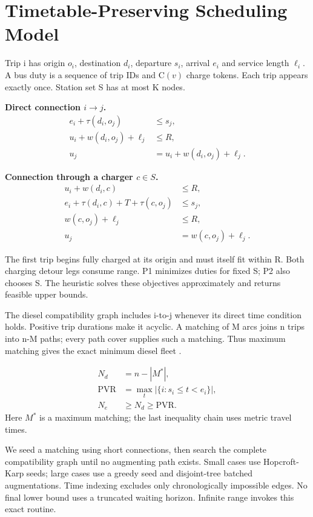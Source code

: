 
\section{Timetable-Preserving Scheduling Model}

Trip i has origin $o_i$, destination $d_i$, departure $s_i$, arrival $e_i$ and service length $\ell_i$. A bus duty is a sequence of trip IDs and $\mathrm{C}(v)$ charge tokens. Each trip appears exactly once. Station set S has at most K nodes.


\noindent\textbf{Direct connection $i\to j$.}
\begin{align}
e_i+\tau(d_i,o_j)&\le s_j,\\
u_i+w(d_i,o_j)+\ell_j&\le R,\\
u_j&=u_i+w(d_i,o_j)+\ell_j.
\end{align}

\noindent\textbf{Connection through a charger $c\in S$.}
\begin{align}
u_i+w(d_i,c)&\le R,\\
e_i+\tau(d_i,c)+T+\tau(c,o_j)&\le s_j,\\
w(c,o_j)+\ell_j&\le R,\\
u_j&=w(c,o_j)+\ell_j.
\end{align}

The first trip begins fully charged at its origin and must itself fit within R. Both charging detour legs consume range. P1 minimizes duties for fixed S; P2 also chooses S. The heuristic solves these objectives approximately and returns feasible upper bounds.


The diesel compatibility graph includes i-to-j whenever its direct time condition holds. Positive trip durations make it acyclic. A matching of M arcs joins n trips into n-M paths; every path cover supplies such a matching. Thus maximum matching gives the exact minimum diesel fleet \cite{ref17}.


\begin{align}
N_d&=n-|M^*|,\\
\mathrm{PVR}&=\max_t\bigl|\{i:s_i\le t<e_i\}\bigr|,\\
N_e&\ge N_d\ge\mathrm{PVR}.
\end{align}
Here $M^*$ is a maximum matching; the last inequality chain uses metric travel times.

We seed a matching using short connections, then search the complete compatibility graph until no augmenting path exists. Small cases use Hopcroft-Karp seeds; large cases use a greedy seed and disjoint-tree batched augmentations. Time indexing excludes only chronologically impossible edges. No final lower bound uses a truncated waiting horizon. Infinite range invokes this exact routine.

